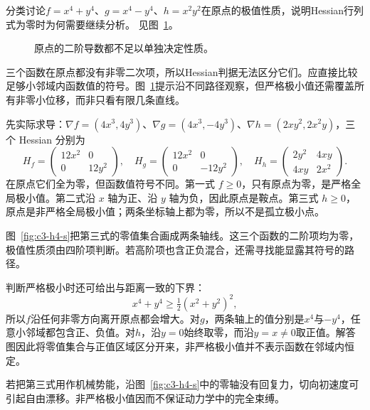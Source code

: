 \begin{exercise}[退化二阶判据]\label{ex:c3-h4}
分类讨论$f=x^4+y^4$、$g=x^4-y^4$、$h=x^2y^2$在原点的极值性质，说明Hessian行列式为零时为何需要继续分析。 见图~\ref{fig:c3-h4-q}。
\end{exercise}

\begin{figure}[H]\centering
{}
\caption{原点的二阶导数都不足以单独决定性质。}\label{fig:c3-h4-q}
\end{figure}
\begin{solution}
三个函数在原点都没有非零二次项，所以Hessian判据无法区分它们。应直接比较足够小邻域内函数值的符号。图~\ref{fig:c3-h4-q}提示沿不同路径观察，但严格极小值还需覆盖所有非零小位移，而非只看有限几条直线。


先实际求导：$\nabla f=(4x^3,4y^3)$、$\nabla g=(4x^3,-4y^3)$、$\nabla h=(2xy^2,2x^2y)$，三个 Hessian 分别为
\[
H_f=\begin{pmatrix}12x^2&0\\0&12y^2\end{pmatrix},\quad
H_g=\begin{pmatrix}12x^2&0\\0&-12y^2\end{pmatrix},\quad
H_h=\begin{pmatrix}2y^2&4xy\\4xy&2x^2\end{pmatrix}.
\]
在原点它们全为零，但函数值符号不同。第一式 $f\ge0$，只有原点为零，是严格全局极小值。第二式沿 $x$ 轴为正、沿 $y$ 轴为负，因此原点是鞍点。第三式 $h\ge0$，原点是非严格全局极小值；两条坐标轴上都为零，所以不是孤立极小点。

图~\ref{fig:c3-h4-s}把第三式的零值集合画成两条轴线。这三个函数的二阶项均为零，极值性质须由四阶项判断。若高阶项也含正负混合，还需寻找能显露其符号的路径。


判断严格极小时还可给出与距离一致的下界：
\[x^4+y^4\ge\tfrac12(x^2+y^2)^2,\]
所以$f$沿任何非零方向离开原点都会增大。对$g$，两条轴上的值分别是$x^4$与$-y^4$，任意小邻域都包含正、负值。对$h$，沿$y=0$始终取零，而沿$y=x\ne0$取正值。解答图因此将零值集合与正值区域区分开来，非严格极小值并不表示函数在邻域内恒定。

若把第三式用作机械势能，沿图~\ref{fig:c3-h4-s}中的零轴没有回复力，切向初速度可引起自由漂移。非严格极小值因而不保证动力学中的完全束缚。


\end{solution}
